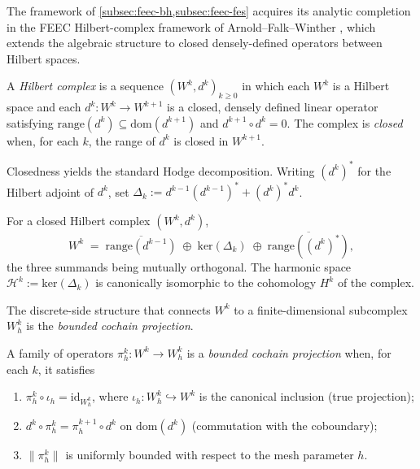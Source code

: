 The framework of \cref{subsec:feec-bh,subsec:feec-fes} acquires its
analytic completion in the FEEC Hilbert-complex framework of
Arnold--Falk--Winther \cite{AFW2006,AFW2010}, which extends the
algebraic structure to closed densely-defined operators between
Hilbert spaces.

\begin{definition}\label{def:afw-hilbert-complex}
A \emph{Hilbert complex} is a sequence $(W^k, d^k)_{k \ge 0}$ in
which each $W^k$ is a Hilbert space and each
$d^k : W^k \to W^{k+1}$ is a closed, densely defined linear operator
satisfying $\mathrm{range}(d^k) \subseteq \mathrm{dom}(d^{k+1})$ and
$d^{k+1} \circ d^k = 0$. The complex is \emph{closed} when, for each
$k$, the range of $d^k$ is closed in $W^{k+1}$.
\end{definition}

Closedness yields the standard Hodge decomposition. Writing
$(d^k)^*$ for the Hilbert adjoint of $d^k$, set
$\Delta_k := d^{k-1} (d^{k-1})^* + (d^k)^* d^k$.

\begin{theorem}\label{thm:afw-hodge}
For a closed Hilbert complex $(W^k, d^k)$,
\[
  W^k \;=\; \overline{\mathrm{range}(d^{k-1})}
  \;\oplus\; \mathrm{ker}(\Delta_k)
  \;\oplus\; \overline{\mathrm{range}((d^k)^*)},
\]
the three summands being mutually orthogonal. The harmonic space
$\mathcal{H}^k := \mathrm{ker}(\Delta_k)$ is canonically isomorphic
to the cohomology $H^k$ of the complex.
\end{theorem}

The discrete-side structure that connects $W^k$ to a finite-dimensional
subcomplex $W_h^k$ is the \emph{bounded cochain projection}.

\begin{definition}\label{def:bounded-pi}
A family of operators $\pi_h^k : W^k \to W_h^k$ is a
\emph{bounded cochain projection} when, for each $k$, it satisfies
\begin{enumerate}
  \item $\pi_h^k \circ \iota_h = \mathrm{id}_{W_h^k}$, where
        $\iota_h : W_h^k \hookrightarrow W^k$ is the canonical
        inclusion (true projection);
  \item $d^k \circ \pi_h^k = \pi_h^{k+1} \circ d^k$ on
        $\mathrm{dom}(d^k)$ (commutation with the coboundary);
  \item $\lVert \pi_h^k \rVert$ is uniformly bounded with respect to
        the mesh parameter $h$.
\end{enumerate}
\end{definition}

